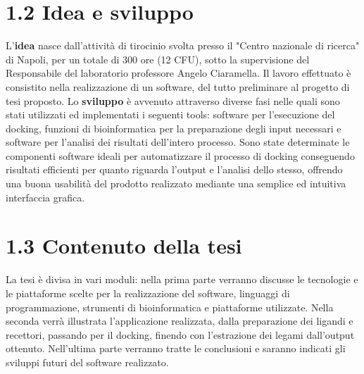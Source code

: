 \section*{1.2 Idea e sviluppo}
\def\baselinestretch{1.66}
\noindent L’\textbf{idea} nasce dall’attività di tirocinio svolta presso il "Centro nazionale di ricerca" di Napoli, per un totale di 300 ore (12 CFU), sotto la supervisione del Responsabile del laboratorio professore Angelo Ciaramella. Il lavoro effettuato è consistito nella realizzazione di un software, del tutto preliminare al progetto di tesi proposto. Lo \textbf{sviluppo} è avvenuto attraverso diverse fasi nelle quali sono stati utilizzati ed implementati i seguenti tools: software per l'esecuzione del docking, funzioni di bioinformatica per la preparazione degli input necessari e software per l'analisi dei risultati dell'intero processo. Sono state determinate le componenti software ideali per automatizzare il processo di docking conseguendo risultati efficienti per quanto riguarda l'output e l'analisi dello stesso, offrendo una buona usabilità del prodotto realizzato mediante una semplice ed intuitiva interfaccia grafica.

\section*{1.3 Contenuto della tesi}
\def\baselinestretch{1.66}
\noindent La tesi è divisa in vari moduli: nella prima parte verranno discusse le tecnologie e le piattaforme scelte per la realizzazione del software, linguaggi di programmazione, strumenti di bioinformatica e piattaforme utilizzate. Nella seconda verrà illustrata l'applicazione realizzata, dalla preparazione dei ligandi e recettori, passando per il docking, finendo con l'estrazione dei legami dall'output ottenuto. Nell'ultima parte verranno tratte le conclusioni e saranno indicati gli sviluppi futuri del software realizzato.
